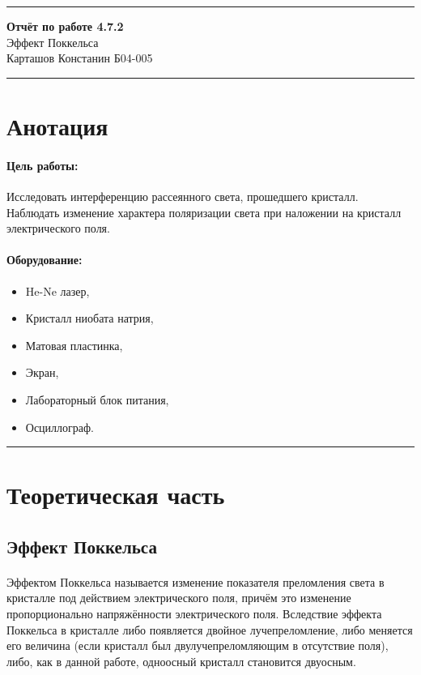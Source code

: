 \documentclass[a4paper,12pt]{article} %
\begin{document}


\hrule 	
\medskip
\begin{raggedright}
{\large \textbf{Отчёт по работе 4.7.2}}
\\
\medskip
{\Large Эффект Поккельса} 
\\
\medskip
{\large Карташов Констанин Б04-005}
\medskip
\hrule
\medskip
\end{raggedright}


\section{Анотация}

\paragraph{Цель работы:} 
Исследовать интерференцию рассеянного света, прошедшего кристалл. Наблюдать изменение характера поляризации света при наложении на кристалл электрического поля.

\paragraph{Оборудование:}
\begin{itemize}
\renewcommand{\labelitemi}{$\triangleright$}
\itemsep0em
\item He-Ne лазер,
\item Кристалл ниобата натрия,
\item Матовая пластинка,
\item Экран,
\item Лабораторный блок питания,
\item Осциллограф.
\end{itemize}


\medskip\hrule\medskip

\section{Теоретическая часть}

\subsection{Эффект Поккельса}

\paragraph{} Эффектом Поккельса называется изменение показателя преломления света в кристалле под действием электрического поля, причём это изменение пропорционально напряжённости электрического поля. Вследствие эффекта Поккельса в кристалле либо появляется двойное лучепреломление, либо меняется его величина (если кристалл был двулучепреломляющим в отсутствие поля), либо, как в данной работе, одноосный кристалл становится двуосным.
\end{document}

